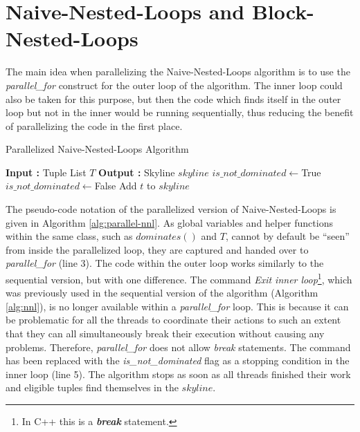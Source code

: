 \section{Naive-Nested-Loops and Block-Nested-Loops}
The main idea when parallelizing the Naive-Nested-Loops algorithm is to use the \textit{parallel\_for} construct for the outer loop of the algorithm. The inner loop could also be taken for this purpose, but then the code which finds itself in the outer loop but not in the inner would be running sequentially, thus reducing the %
benefit of parallelizing the code in the first place. 

\begin{algorithm}[h]
	\caption{Parallelized Naive-Nested-Loops Algorithm} \label{alg:parallel-nnl}
	\begin{algorithmic}[1]		
		\State \textbf{Input :} Tuple List $T$
		\State \textbf{Output :} Skyline $skyline$
			\State $is\_not\_dominated \gets $True
					\State $is\_not\_dominated \gets $False
				\EndIf
			\EndFor
				\State Add $t$ to $skyline$
			\EndIf
		\EndPFor
	\end{algorithmic}
\end{algorithm}

The pseudo-code notation of the parallelized version of Naive-Nested-Loops is given in Algorithm \ref{alg:parallel-nnl}. As global variables and helper functions within the same class, such as $dominates()$ and $T$, cannot by default be ``seen'' from inside the parallelized loop, they are captured and handed over to \textit{parallel\_for} (line 3). The code within the outer loop works similarly to the sequential version, but with one difference. 
The command \textit{Exit inner loop}\footnote{In C++ this is a \textbf{\textit{break}} statement.}, which was previously used in the sequential version of the algorithm (Algorithm \ref{alg:nnl}), is no longer available within a \textit{parallel\_for} loop. This is because it can be problematic for all the threads to coordinate their actions to such an extent that they can all simultaneously break their execution without causing any problems. Therefore, \textit{parallel\_for} does not allow \textit{break} statements. The command has been replaced with the \textit{is\_not\_dominated} flag as a stopping condition in the inner loop (line 5). The algorithm stops as soon as all threads finished their work and eligible tuples find themselves in the $skyline$. 

